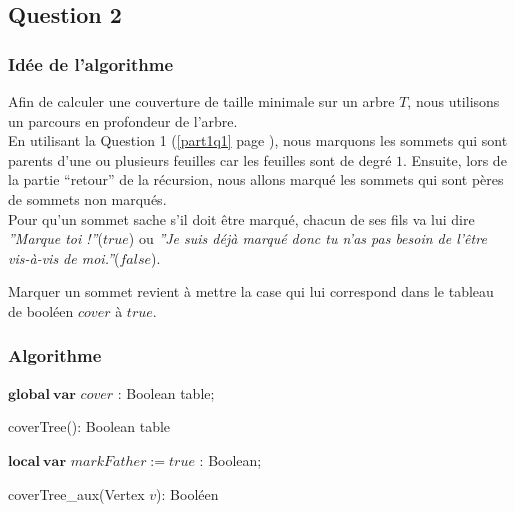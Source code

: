   \subsection{Question 2}
  
   \subsubsection{Idée de l'algorithme}
   Afin de calculer une couverture de taille minimale sur un arbre $T$,
   nous utilisons un parcours en profondeur de l'arbre.\\
   En utilisant la Question 1 (\ref{part1q1} page \pageref{part1q1}),
   nous marquons les sommets qui sont parents d'une ou plusieurs
   feuilles car les feuilles sont de degré $1$. Ensuite, lors de la
   partie ``retour'' de la récursion, nous allons marqué les sommets
   qui sont pères de sommets non marqués.\\

   Pour qu'un sommet sache s'il doit être marqué, chacun de ses fils va
   lui dire \emph{''Marque toi !''}($true$) ou \emph{''Je suis déjà
   marqué donc tu n'as pas besoin de l'être vis-à-vis de
   moi.''}($false$).

   Marquer un sommet revient à mettre la case qui lui correspond dans
   le tableau de booléen $cover$ à $true$.

   \subsubsection{Algorithme}
   \begin{algorithm}[!ht]
     \SetLine
     $\mathbf{global~var}$ $cover$ : Boolean table;\\
     \caption{coverTree(): Boolean table}
   \end{algorithm}

   \begin{algorithm}[!ht]
     \SetLine
     $\mathbf{local~var}$ $markFather := true$ : Boolean;\\
     \caption{coverTree\_aux(Vertex $v$): Booléen}
   \end{algorithm}
   
